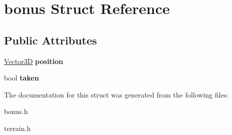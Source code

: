 \hypertarget{classbonus}{\section{bonus \-Struct \-Reference}
\label{classbonus}
}
\subsection*{\-Public \-Attributes}
\begin{DoxyCompactItemize}
\item 
\hypertarget{classbonus_a581d1ff363d3eb8de4185b832c9b02ed}{\hyperlink{classVector3D}{\-Vector3\-D} {\bfseries position}}\label{classbonus_a581d1ff363d3eb8de4185b832c9b02ed}

\item 
\hypertarget{classbonus_a070f8351be301cf43e63cfefd2cf23a5}{bool {\bfseries taken}}\label{classbonus_a070f8351be301cf43e63cfefd2cf23a5}

\end{DoxyCompactItemize}


\-The documentation for this struct was generated from the following files\-:\begin{DoxyCompactItemize}
\item 
bonus.\-h\item 
terrain.\-h\end{DoxyCompactItemize}
